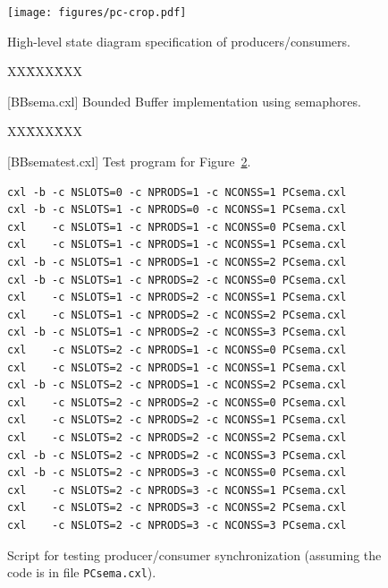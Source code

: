 \documentclass{report}
\newcommand{\cxlsource}[1]{
\begin{tabbing}
XX\=XXX\=XXX\kill
    
\end{tabbing}
}
\newenvironment{code}{
\tcolorbox
}{
\endtcolorbox
}
\begin{document}

\begin{figure}
\begin{center}
\texttt{[image: figures/pc-crop.pdf]}
\end{center}
\caption{High-level state diagram specification of producers/consumers.}
\label{fig:pc}
\end{figure}

\begin{figure}
\begin{code}
\cxlsource{BBsema}
\end{code}
\caption{[BBsema.cxl] Bounded Buffer implementation using semaphores.}
\label{fig:boundedbuffer}
\end{figure}

\begin{figure}
\begin{code}
\cxlsource{BBsematest}
\end{code}
\caption{[BBsematest.cxl] Test program for Figure~\ref{fig:boundedbuffer}.}
\label{fig:bbtest}
\end{figure}

\begin{figure}
\begin{code}
\begin{verbatim}
cxl -b -c NSLOTS=0 -c NPRODS=1 -c NCONSS=1 PCsema.cxl
cxl -b -c NSLOTS=1 -c NPRODS=0 -c NCONSS=1 PCsema.cxl
cxl    -c NSLOTS=1 -c NPRODS=1 -c NCONSS=0 PCsema.cxl
cxl    -c NSLOTS=1 -c NPRODS=1 -c NCONSS=1 PCsema.cxl
cxl -b -c NSLOTS=1 -c NPRODS=1 -c NCONSS=2 PCsema.cxl
cxl -b -c NSLOTS=1 -c NPRODS=2 -c NCONSS=0 PCsema.cxl
cxl    -c NSLOTS=1 -c NPRODS=2 -c NCONSS=1 PCsema.cxl
cxl    -c NSLOTS=1 -c NPRODS=2 -c NCONSS=2 PCsema.cxl
cxl -b -c NSLOTS=1 -c NPRODS=2 -c NCONSS=3 PCsema.cxl
cxl    -c NSLOTS=2 -c NPRODS=1 -c NCONSS=0 PCsema.cxl
cxl    -c NSLOTS=2 -c NPRODS=1 -c NCONSS=1 PCsema.cxl
cxl -b -c NSLOTS=2 -c NPRODS=1 -c NCONSS=2 PCsema.cxl
cxl    -c NSLOTS=2 -c NPRODS=2 -c NCONSS=0 PCsema.cxl
cxl    -c NSLOTS=2 -c NPRODS=2 -c NCONSS=1 PCsema.cxl
cxl    -c NSLOTS=2 -c NPRODS=2 -c NCONSS=2 PCsema.cxl
cxl -b -c NSLOTS=2 -c NPRODS=2 -c NCONSS=3 PCsema.cxl
cxl -b -c NSLOTS=2 -c NPRODS=3 -c NCONSS=0 PCsema.cxl
cxl    -c NSLOTS=2 -c NPRODS=3 -c NCONSS=1 PCsema.cxl
cxl    -c NSLOTS=2 -c NPRODS=3 -c NCONSS=2 PCsema.cxl
cxl    -c NSLOTS=2 -c NPRODS=3 -c NCONSS=3 PCsema.cxl
\end{verbatim}
\end{code}
\caption{Script for testing producer/consumer synchronization
(assuming the code is in file \texttt{PCsema.cxl}).}
\label{fig:pcscript}
\end{figure}
\end{document}
